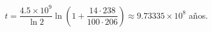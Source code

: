 $t=\dfrac{4.5\times10^9}{\ln2}\ln\!\left(1+\dfrac{14\cdot238}{100\cdot206}\right)\approx9.73335\times10^8$ años.
